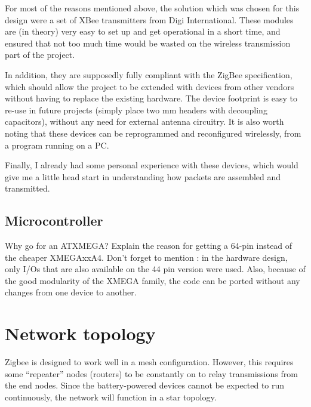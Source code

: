 For most of the reasons mentioned above, the solution which was chosen for this
design were a set of XBee transmitters from Digi
International. These modules are (in theory) very easy to
set up and get operational in a short time, and ensured that not too much time
would be wasted on the wireless transmission part of the project.

In addition, they are supposedly fully compliant with the
ZigBee specification, which should allow the project to
be extended with devices from other vendors without having to replace the
existing hardware. The device footprint is easy to re-use in future projects
(simply place two \unit[2]{mm} headers with decoupling capacitors), without any
need for external antenna circuitry. It is also worth noting that these devices
can be reprogrammed and reconfigured wirelessly, from a program running on a PC.

Finally, I already had some personal experience with these devices, which would
give me a little head start in understanding how packets are assembled and
transmitted.



\subsection{Microcontroller}
\label{sub:microcontroller}
Why go for an ATXMEGA?
Explain the reason for getting a 64-pin instead of the cheaper XMEGAxxA4.
Don't forget to mention : in the hardware design, only I/Os that are also
available on the 44 pin version were used. Also, because of the good modularity
of the XMEGA family, the code can be ported without any changes from one device
to another.

\pagebreak
\section{Network topology}
\label{sec:network-topology}

Zigbee is designed to work well in a mesh configuration. However, this requires
some ``repeater'' nodes (routers) to be constantly on to relay transmissions
from the end nodes. Since the battery-powered devices cannot be expected to run
continuously, the network will function in a star topology.

